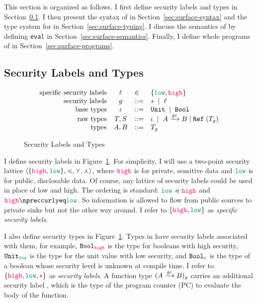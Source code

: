 This section is organized as follows. I first define security labels and types
in Section~\ref{sec:labels-and-types}. I then present the syntax of \Surface in
Section~\ref{sec:surface-syntax} and the type system for \Surface in
Section~\ref{sec:surface-typing}. I discuss the semantics of \Surface by
defining \texttt{eval} in Section~\ref{sec:surface-semantics}. Finally, I define
whole programs of \Surface in Section~\ref{sec:surface-programs}.

\subsection{Security Labels and Types}
\label{sec:labels-and-types}

\begin{figure}[tbp]
\raggedright
  {\small
  \[
  \begin{array}{rcll}
    \text{specific security labels} & \ell & \in & \{ \low , \high \} \\
    \text{security labels}  & g    & ::= & \unk \MID \ell \\
    \text{base types}               & \iota     & ::= & \Unit \MID \Bool \\
    \text{raw types}                & T, S      & ::= & \iota \MID \Fun{A}{\gc}{B} \mid \Refer{(T_g)} \\
    \text{types}                    & A, B      & ::= & T_g \\
  \end{array}
  \]}
  \caption{Security Labels and Types}
  \label{fig:labels-and-types}
\end{figure}

I define security labels in Figure~\ref{fig:labels-and-types}. For simplicity, I
will use a two-point security lattice $\langle \{\high, \low\} , \preccurlyeq,
\curlyvee , \curlywedge \rangle$, where $\high$ is for private, sensitive data
and $\low$ is for public, disclosable data. Of course, any lattice of security
labels could be used in place of low and high. The ordering is standard: $\low
\preccurlyeq \high$ and $\high \npreccurlyeq \low$. So information is allowed to
flow from public sources to private sinks but not the other way around. I refer
to $\{\high,\low\}$ as \emph{specific security labels}.

I also define security types in Figure~\ref{fig:labels-and-types}. Types in
\Surface have security labels associated with them, for example, $\Bool_{\high}$
is the type for booleans with high security, $\Unit_{\low}$ is the type for the
unit value with low security, and $\Bool_{\unk}$ is the type of a boolean whose
security level is unknown at compile time. I refer to $\{\high,\low,\unk\}$ as
\emph{security labels}. A function type $({A}\xrightarrow{{\mathit{gc}}}{B})_g$ carries an
additional security label \gc, which is the type of the program counter (PC) to
evaluate the body of the function.

